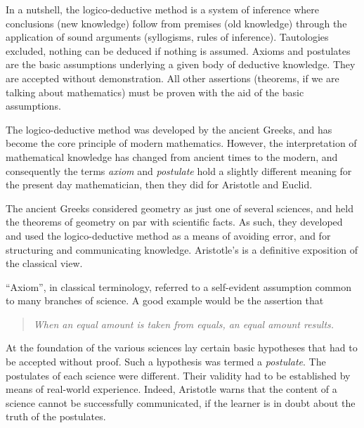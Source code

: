 \documentclass[12pt]{article}
\begin{document}
In a nutshell, the logico-deductive method is a system of inference
where conclusions (new knowledge) follow from premises (old knowledge)
through the application of sound arguments (syllogisms, rules of
inference).  Tautologies excluded, nothing can be deduced if nothing
is assumed.  Axioms and postulates are the basic assumptions
underlying a given body of deductive knowledge.  They are accepted
without demonstration.  All other assertions (theorems, if we are
talking about mathematics) must be proven with the aid of the basic
assumptions.


The logico-deductive method was developed by the ancient Greeks, and
has become the core principle of modern mathematics.  However, the
interpretation of mathematical knowledge has changed from ancient
times to the modern, and consequently the terms \emph{axiom} and
\emph{postulate} hold a slightly different meaning for the present day
mathematician, then they did for Aristotle and Euclid.

The ancient Greeks considered geometry as just one of several
sciences, and held the theorems of geometry on par with scientific
facts.  As such, they developed and used the logico-deductive method
as a means of avoiding error, and for structuring and communicating
knowledge.  Aristotle's 
is a definitive exposition of the classical view.

``Axiom'', in classical terminology, referred to a self-evident assumption
common to many branches of science.  A good example would be the
assertion that
\begin{quote}
  \em When an equal amount is taken from equals, an equal amount results.
\end{quote}

At the foundation of the various sciences lay certain basic hypotheses
that had to be accepted without proof.  Such a hypothesis was termed a
\emph{postulate}.  The postulates of each science were different.
Their validity had to be established by means of real-world
experience. Indeed, Aristotle warns that the content of a science
cannot be successfully communicated, if the learner is in doubt about
the truth of the postulates.
\end{document}
